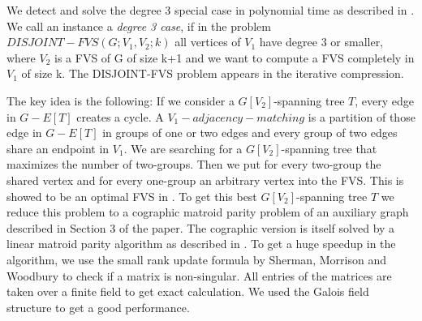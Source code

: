 \documentclass[11pt,a4paper]{scrartcl}
\begin{document}
We detect and solve the degree 3 special case in polynomial time as described in \cite{DBLP:journals/corr/abs-1004-1672}. We call an instance a \textit{degree 3 case}, if in the problem $DISJOINT-FVS(G; V_1, V_2; k)$ all vertices of $V_1$ have degree 3 or smaller, where $V_2$ is a FVS of G of size k+1 and we want to compute a FVS completely in $V_1$ of size k. The DISJOINT-FVS problem appears in the iterative compression.


The key idea is the following: If we consider a $G[V_2]$-spanning tree $T$, every edge in $G - E[T]$ creates a cycle. A $V_1-adjacency-matching$ is a partition of those edge in $G - E[T]$ in groups of one or two edges and every group of two edges share an endpoint in $V_1$. We are searching for a $G[V_2]$-spanning tree that maximizes the number of two-groups. Then we put for every two-group the shared vertex and for every one-group an arbitrary vertex into the FVS. This is showed to be an optimal FVS in \cite{DBLP:journals/corr/abs-1004-1672}. To get this best $G[V_2]$-spanning tree $T$ we reduce this problem to a cographic matroid parity problem of an auxiliary graph described in Section 3 of the paper. The cographic version is itself solved by a linear matroid parity algorithm as described in \cite{Cheung:2014:AAL:2620785.2601066}. To get a huge speedup in the algorithm, we use the small rank update formula by Sherman, Morrison and Woodbury to check if a matrix is non-singular. All entries of the matrices are taken over a finite field to get exact calculation. We used the Galois field structure to get a good performance.



\nocite{bafna1999}
\nocite{chen2008}


\end{document}
